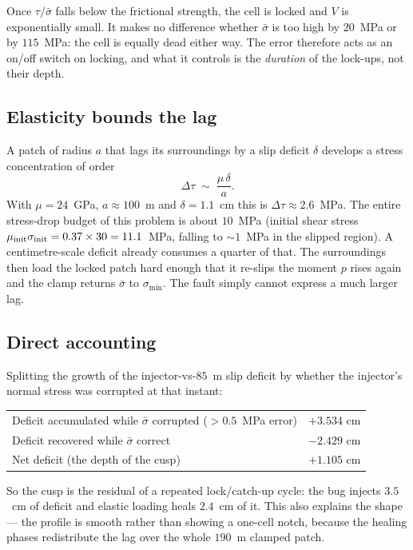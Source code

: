 \documentclass[11pt]{article}
\newcommand{\sigeff}{\bar{\sigma}}
\begin{document}
Once $\tau/\sigeff$ falls below the frictional strength, the cell is locked
and $V$ is exponentially small. It makes no difference whether $\sigeff$ is
too high by $20$~MPa or by $115$~MPa: the cell is equally dead either way. The
error therefore acts as an on/off switch on locking, and what it controls is
the \emph{duration} of the lock-ups, not their depth.

\subsection{Elasticity bounds the lag}

A patch of radius $a$ that lags its surroundings by a slip deficit $\delta$
develops a stress concentration of order
\begin{equation}
  \Delta\tau \;\sim\; \frac{\mu\,\delta}{a}.
  \label{eq:stiffness}
\end{equation}
With $\mu=24$~GPa, $a\approx100$~m and $\delta=1.1$~cm this is
$\Delta\tau\approx2.6$~MPa. The entire stress-drop budget of this problem is
about $10$~MPa (initial shear stress $\mu_{\rm init}\sigma_{\rm init} =
0.37\times30 = 11.1$~MPa, falling to ${\sim}1$~MPa in the slipped region).
A centimetre-scale deficit already consumes a quarter of that. The
surroundings then load the locked patch hard enough that it re-slips the
moment $p$ rises again and the clamp returns $\sigeff$ to $\sigma_{\min}$.
The fault simply cannot express a much larger lag.

\subsection{Direct accounting}

Splitting the growth of the injector-vs-$85$~m slip deficit by whether the
injector's normal stress was corrupted at that instant:

\begin{center}
\begin{tabular}{lr}
\toprule
Deficit accumulated while $\sigeff$ corrupted ($>0.5$~MPa error) & $+3.534$ cm \\
Deficit recovered while $\sigeff$ correct                        & $-2.429$ cm \\
\midrule
Net deficit (the depth of the cusp)                              & $+1.105$ cm \\
\bottomrule
\end{tabular}
\end{center}

So the cusp is the residual of a repeated lock/catch-up cycle: the bug injects
$3.5$~cm of deficit and elastic loading heals $2.4$~cm of it. This also
explains the shape --- the profile is smooth rather than showing a one-cell
notch, because the healing phases redistribute the lag over the whole
$190$~m clamped patch.
\end{document}
